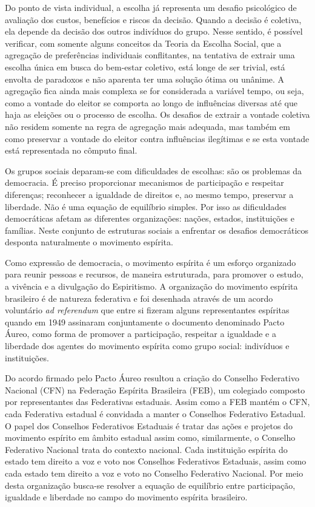 \begin{citacao}
	Do ponto de vista individual, a escolha já representa um desafio psicológico de avaliação dos custos, benefícios e riscos da decisão. Quando a decisão é coletiva, ela depende da decisão dos outros indivíduos do grupo. Nesse sentido, é possível verificar, com somente alguns conceitos da Teoria da Escolha Social, que a agregação de preferências individuais conflitantes, na tentativa de extrair uma escolha única em busca do bem-estar coletivo, está longe de ser trivial, está envolta de paradoxos e não aparenta ter uma solução ótima ou unânime. A agregação fica ainda mais complexa se for considerada a variável tempo, ou seja, como a vontade do eleitor se comporta ao longo de influências diversas até que haja as eleições ou o processo de escolha. Os desafios de extrair a vontade coletiva não residem somente na regra de agregação mais adequada, mas também em como preservar a vontade do eleitor contra influências ilegítimas e se esta vontade está representada no cômputo final. \cite[p. 45]{rafaelazevedo2014}
\end{citacao}

Os grupos sociais deparam-se com dificuldades de escolhas: são os problemas da democracia. É preciso proporcionar mecanismos de participação e respeitar diferenças; reconhecer a igualdade de direitos e, ao mesmo tempo, preservar a liberdade. Não é uma equação de equilíbrio simples. Por isso as dificuldades democráticas afetam as diferentes organizações: nações, estados, instituições e famílias. Neste conjunto de estruturas sociais a enfrentar os desafios democráticos desponta naturalmente o movimento espírita.

Como expressão de democracia, o movimento espírita é um esforço organizado para reunir pessoas e recursos, de maneira estruturada, para promover o estudo, a vivência e a divulgação do Espiritismo. A organização do movimento espírita brasileiro é de natureza federativa e foi desenhada através de um acordo voluntário \textit{ad referendum} que entre si fizeram alguns representantes espíritas quando em 1949 assinaram conjuntamente o documento denominado Pacto Áureo\cite{pactoaureo2012}, como forma de promover a participação, respeitar a igualdade e a liberdade dos agentes do movimento espírita como grupo social: indivíduos e instituições. 

Do acordo firmado pelo Pacto Áureo resultou a criação do Conselho Federativo Nacional (CFN) na Federação Espírita Brasileira (FEB), um colegiado composto por representantes das Federativas estaduais. Assim como a FEB mantém o CFN, cada Federativa estadual é convidada a manter o Conselhos Federativo Estadual. O papel dos Conselhos Federativos Estaduais é tratar das ações e projetos do movimento espírito em âmbito estadual assim como, similarmente, o Conselho Federativo Nacional trata do contexto nacional. Cada instituição espírita do estado tem direito a voz e voto nos Conselhos Federativos Estaduais, assim como cada estado tem direito a voz e voto no Conselho Federativo Nacional. Por meio desta organização busca-se resolver a equação de equilíbrio entre participação, igualdade e liberdade no campo do movimento espírita brasileiro.

